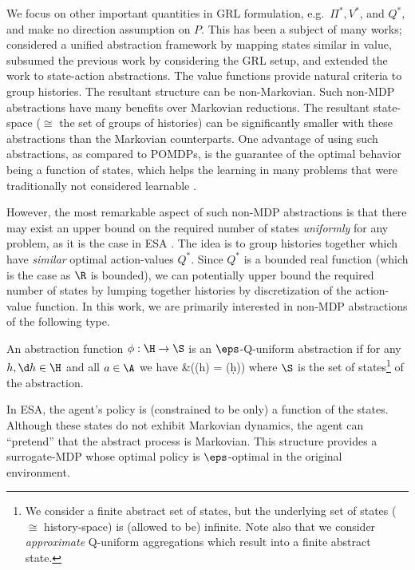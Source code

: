 \documentclass{article} %
\let\defOrg\definition
\let\enddefOrg\enddefinition
\renewenvironment{definition}{\begin{tcolorbox}\defOrg}{\enddefOrg\end{tcolorbox}}
\begin{document}
We focus on other important quantities in GRL formulation, e.g.\ $\Pi^*, V^*$, and $Q^*$, and make no direction assumption on $P$. This has been a subject of many works; \cite{Li2006,Abel2016} considered a unified abstraction framework by mapping states similar in value, \citet{Hutter2016} subsumed the previous work by considering the GRL setup, and \citet{Majeed2019} extended the work to state-action abstractions. The value functions provide natural criteria to group histories. The resultant structure can be non-Markovian. Such non-MDP abstractions have many benefits over Markovian reductions. The resultant state-space ($\cong$ the set of groups of histories) can be significantly smaller with these abstractions than the Markovian counterparts. One advantage of using such abstractions, as compared to POMDPs, is the guarantee of the optimal behavior being a function of states, which helps the learning in many problems that were traditionally not considered learnable \cite{Majeed2018}.

However, the most remarkable aspect of such non-MDP abstractions is that there may exist an upper bound on the required number of states \emph{uniformly} for any problem, as it is the case in ESA \cite{Hutter2016}.
The idea is to group histories together which have \emph{similar} optimal action-values $Q^*$. Since $Q^*$ is a bounded real function (which is the case as $\R$ is bounded), we can potentially upper bound the required number of states by lumping together histories by discretization of the action-value function. In this work, we are primarily interested in non-MDP abstractions of the following type.

\begin{definition}[$\eps$-Q-uniform abstraction]
An abstraction function $\phi: \H \to \S$ is an $\eps$-Q-uniform abstraction if for any $h, \d h \in \H$ and all $a \in \A$ we have
\bqan
&\left(\phi(h) = \phi(\d h)\right)\implies {} \leq \eps
\eqan
where $\S$ is the set of states\footnote{We consider a finite abstract set of states, but the underlying set of states ($\cong$ history-space) is (allowed to be) infinite. Note also that we consider \emph{approximate} Q-uniform aggregations which result into a finite abstract state.} of the abstraction.
\end{definition}

In ESA, the agent's policy is (constrained to be only) a function of the states. Although these states do not exhibit Markovian dynamics, the agent can ``pretend'' that the abstract process is Markovian. This structure provides a surrogate-MDP whose optimal policy is $\eps$-optimal in the original environment.
\end{document}
